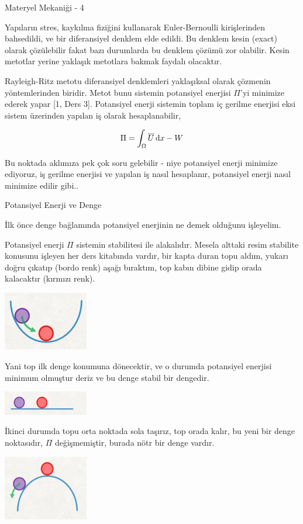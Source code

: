 \documentclass[12pt,fleqn]{article}\usepackage{../../common}
\begin{document}
Materyel Mekaniği - 4

Yapıların stres, kaykılma fiziğini kullanarak Euler-Bernoulli kirişlerinden
bahsedildi, ve bir diferansiyel denklem elde edildi. Bu denklem kesin (exact)
olarak çözülebilir fakat bazı durumlarda bu denklem çözümü zor olabilir. Kesin
metotlar yerine yaklaşık metotlara bakmak faydalı olacaktır.

Rayleigh-Ritz metotu diferansiyel denklemleri yaklaşıksal olarak çözmenin
yöntemlerinden biridir. Metot bunu sistemin potansiyel enerjisi $\Pi$'yi
minimize ederek yapar [1, Ders 3]. Potansiyel enerji sistemin toplam iç gerilme
enerjisi eksi sistem üzerinden yapılan iş olarak hesaplanabilir,

$$
\Pi = \int_\Omega \overline{U} \,\mathrm{d} x - W
$$

Bu noktada aklımıza pek çok soru gelebilir - niye potansiyel enerji minimize
ediyoruz, iş gerilme enerjisi ve yapılan iş nasıl hesaplanır, potansiyel enerji
nasıl minimize edilir gibi..

Potansiyel Enerji ve Denge

İlk önce denge bağlamında potansiyel enerjinin ne demek olduğunu işleyelim.

Potansiyel enerji $\Pi$ sistemin stabilitesi ile alakalıdır. Mesela alttaki
resim stabilite konusunu işleyen her ders kitabında vardır, bir kapta duran topu
aldım, yukarı doğru çıkatıp (bordo renk) aşağı bıraktım, top kabın dibine gidip
orada kalacaktır (kırmızı renk). 

\includegraphics[width=10em]{phy_020_strs_04_01.jpg}

Yani top ilk denge konumuna dönecektir, ve o durumda potansiyel enerjisi minimum
olmuştur deriz ve bu denge stabil bir dengedir.

\includegraphics[width=10em]{phy_020_strs_04_02.jpg}

İkinci durumda topu orta noktada sola taşırız, top orada kalır, bu yeni
bir denge noktasıdır, $\Pi$ değişmemiştir, burada nötr bir denge vardır.

\includegraphics[width=10em]{phy_020_strs_04_03.jpg}
\end{document}
